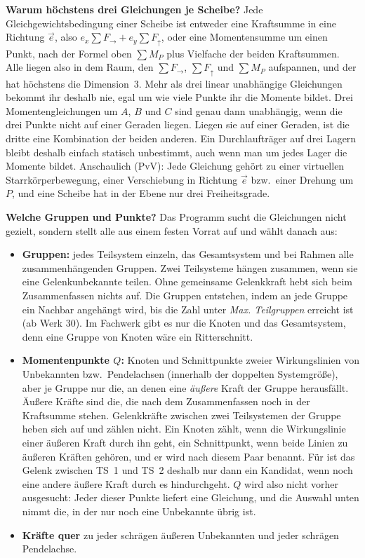 \textbf{Warum höchstens drei Gleichungen je Scheibe?} Jede Gleichgewichtsbedingung einer Scheibe ist
entweder eine Kraftsumme in eine Richtung $\vec e$, also $e_x \sum F_\rightarrow + e_y \sum
F_\uparrow$, oder eine Momentensumme um einen Punkt, nach der Formel oben $\sum M_P$ plus Vielfache
der beiden Kraftsummen. Alle liegen also in dem Raum, den $\sum F_\rightarrow$, $\sum F_\uparrow$ und
$\sum M_P$ aufspannen, und der hat höchstens die Dimension~3. Mehr als drei linear unabhängige
Gleichungen bekommt ihr deshalb nie, egal um wie viele Punkte ihr die Momente bildet. Drei
Momentengleichungen um $A$, $B$ und $C$ sind genau dann unabhängig, wenn die drei Punkte nicht auf
einer Geraden liegen. Liegen sie auf einer Geraden, ist die dritte eine Kombination der beiden
anderen. Ein Durchlaufträger auf drei Lagern bleibt deshalb einfach statisch unbestimmt, auch wenn
man um jedes Lager die Momente bildet. Anschaulich (PvV): Jede Gleichung gehört zu einer virtuellen
Starrkörperbewegung, einer Verschiebung in Richtung $\vec e$ bzw.\ einer Drehung um $P$, und eine
Scheibe hat in der Ebene nur drei Freiheitsgrade.

\textbf{Welche Gruppen und Punkte?} Das Programm sucht die Gleichungen nicht gezielt, sondern stellt
alle aus einem festen Vorrat auf und wählt danach aus:

\begin{itemize}
  \item \textbf{Gruppen:} jedes Teilsystem einzeln, das Gesamtsystem und bei Rahmen alle
        zusammenhängenden Gruppen. Zwei Teilsysteme hängen zusammen, wenn sie eine
        Gelenkunbekannte teilen. Ohne gemeinsame Gelenkkraft hebt sich beim Zusammenfassen nichts
        auf. Die Gruppen entstehen, indem an jede Gruppe ein Nachbar angehängt wird, bis die
        Zahl unter \emph{Max. Teilgruppen} erreicht ist (ab Werk 30). Im Fachwerk gibt es nur die Knoten und das
        Gesamtsystem, denn eine Gruppe von Knoten wäre ein Ritterschnitt.
  \item \textbf{Momentenpunkte $Q$:} Knoten und Schnittpunkte zweier Wirkungslinien von
        Unbekannten bzw.\ Pendelachsen (innerhalb der doppelten Systemgröße), aber je Gruppe nur
        die, an denen eine \emph{äußere} Kraft der Gruppe herausfällt. Äußere Kräfte sind die, die
        nach dem Zusammenfassen noch in der Kraftsumme stehen. Gelenkkräfte zwischen zwei
        Teilsystemen der Gruppe heben sich auf und zählen nicht. Ein Knoten zählt, wenn die
        Wirkungslinie einer äußeren Kraft durch ihn geht, ein Schnittpunkt, wenn beide Linien zu
        äußeren Kräften gehören, und er wird nach diesem Paar benannt. Für  ist das
        Gelenk zwischen TS~1 und TS~2 deshalb nur dann ein Kandidat, wenn noch eine andere äußere
        Kraft durch es hindurchgeht. $Q$ wird also nicht vorher ausgesucht: Jeder dieser Punkte
        liefert eine Gleichung, und die Auswahl unten nimmt die, in der nur noch eine Unbekannte
        übrig ist.
  \item \textbf{Kräfte quer} zu jeder schrägen äußeren Unbekannten und jeder schrägen Pendelachse.
\end{itemize}


